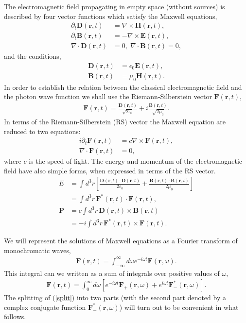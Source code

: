 \documentclass[twocolumn,aps,pra,10pt]{revtex4-1}
\begin{document}
The electromagnetic field propagating in empty space (without sources) is described by four vector functions which satisfy the Maxwell equations,
\begin{align}\label{max}
\partial_t{\bm D}({\bm r},t)&=\nabla\times{\bm H}({\bm r},t),\\
\partial_t{\bm B}({\bm r},t)&=-\nabla\times{\bm E}({\bm r},t),\\
\nabla\cdot{\bm D}({\bm r},t)&=0,\;\nabla\cdot{\bm B}({\bm r},t)=0,
\end{align}
and the conditions,
\begin{align}\label{cond}
{\bm D}({\bm r},t)&=\epsilon_0{\bm E}({\bm r},t),\\
{\bm B}({\bm r},t)&=\mu_0{\bm H}({\bm r},t).
\end{align}
In order to establish the relation between the classical electromagnetic field and the photon wave function we shall use \cite{qed,sil,pwf,rs} the Riemann-Silberstein vector ${\bm F}({\bm r},t)$,
\begin{align}\label{rs}
{\bm F}({\bm r},t)=\frac{{\bm D}({\bm r},t)}{\sqrt{2\epsilon_0}}+i\frac{{\bm B}({\bm r},t)}{\sqrt{2\mu_0}}.
\end{align}
In terms of the Riemann-Silberstein (RS) vector the Maxwell equation are reduced to two equations:
\begin{align}
i\partial_t{\bm F}({\bm r},t)&=c\nabla\times{\bm F}({\bm r},t),\label{maxrs}\\
\nabla\cdot{\bm F}({\bm r},t)&=0,\label{div}
\end{align}
where $c$ is the speed of light. The energy and momentum of the electromagnetic field have also simple forms, when expressed in terms of the RS vector.
\begin{align}
E&=\int\!\!d^3r\left[\frac{{\bm D}(\bm r,t)\!\cdot\!{\bm D}(\bm r,t)}{2\varepsilon_0}+\frac{{\bm B}(\bm r,t)\!\cdot\!{\bm B}(\bm r,t)}{2\mu_0}\right]\nonumber\\
&=\int\!d^3r\,{\bm F}^*(\bm r,t)\!\cdot\!{\bm F}(\bm r,t),\label{enf}\\
{\bm P}&=c\int\!d^3r\,{\bm D}(\bm r,t)\times{\bm B}(\bm r,t)\nonumber\\
&=-i\int\!d^3r\,{\bm F}^*(\bm r,t)\times{\bm F}(\bm r,t).\label{momf}
\end{align}

We will represent the solutions of Maxwell equations as a Fourier transform of monochromatic waves,
\begin{align}\label{genf}
{\bm F}({\bm r},t)=\int_{-\infty}^\infty\!d\omega e^{-i\omega t}{\bm{F}}({\bm r},\omega).
\end{align}
This integral can we written as a sum of integrals over positive values of $\omega$,
\begin{align}\label{split}
{\bm F}({\bm r},t)=\int_0^\infty\!d\omega\left[e^{-i\omega t}{\bm F}_+({\bm r},\omega) + e^{i\omega t}{\bm F}^*_-({\bm r},\omega)\right].
\end{align}
The splitting of (\ref{split}) into two parts (with the second part denoted by a complex conjugate function ${\bm F}^*_-({\bm r},\omega)$) will turn out to be convenient in what follows.
\end{document}
